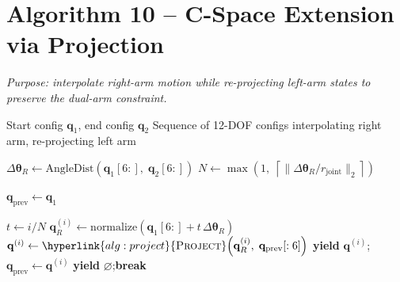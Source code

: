 \documentclass[11pt]{article}
\newcommand{\algorithmicbreak}{\textbf{break}}
\newcommand{\Break}{\State \algorithmicbreak}
\newcommand{\AlgTarget}[1]{\hypertarget{#1}{}}
\newcommand{\AlgLink}[2]{\hyperlink{#1}{#2}}
\begin{document}
\section*{Algorithm 10 -- C-Space Extension via Projection}
\noindent\textit{Purpose: interpolate right-arm motion while re-projecting left-arm states to preserve the dual-arm constraint.}
\AlgTarget{alg:cspace_extend_projection}
\begin{algorithm}[H]
\caption{\textsc{CSpaceExtendWithProjection}($\mathbf{q}_1,\, \mathbf{q}_2$)}
\begin{algorithmic}[1]
\Require Start config $\mathbf{q}_1$, end config $\mathbf{q}_2$
\Ensure  Sequence of 12-DOF configs interpolating right arm, re-projecting left arm

\State $\Delta\boldsymbol{\theta}_R \gets \text{AngleDist}(\mathbf{q}_1[6:],\; \mathbf{q}_2[6:])$
\State $N \gets \max\!\left(1,\;\left\lceil \|\Delta\boldsymbol{\theta}_R / r_{\text{joint}}\|_2 \right\rceil\right)$
\quad{}

\State $\mathbf{q}_{\text{prev}} \gets \mathbf{q}_1$

  \State $t \gets i/N$
  \State $\mathbf{q}_R^{(i)} \gets \text{normalize}\!\left(\mathbf{q}_1[6:] + t\,\Delta\boldsymbol{\theta}_R\right)$
  \State $\mathbf{q}^{(i)} \gets \AlgLink{alg:project}{\textsc{Project}}\!\left(\mathbf{q}_R^{(i)},\; \mathbf{q}_{\text{prev}}[:6]\right)$
    \State \textbf{yield} $\mathbf{q}^{(i)}$;\quad $\mathbf{q}_{\text{prev}} \gets \mathbf{q}^{(i)}$
  \Else
    \State \textbf{yield} $\varnothing$;\quad \Break
  \EndIf
\EndFor
\end{algorithmic}
\end{algorithm}

\end{document}
